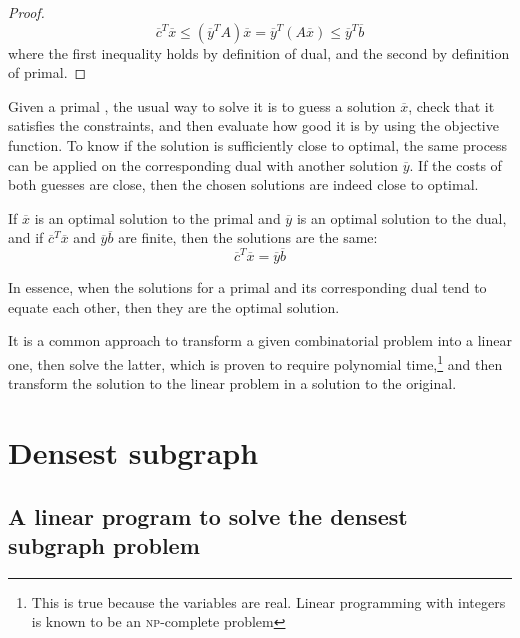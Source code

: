 \begin{proof}
    \[
        \overline{c}^T \overline{x} \leq (\overline{y}^T A)\overline{x} = \overline{y}^T (A \overline{x}) \leq \overline{y}^T \overline{b}
    \]
    where the first inequality holds by definition of dual, and the second by definition of primal.
\end{proof}

Given a primal \lp{}, the usual way to solve it is to guess a solution $\overline{x}$, check that it satisfies the constraints, and then evaluate how good it is by using the objective function. To know if the solution is sufficiently close to optimal, the same process can be applied on the corresponding dual \lp{} with another solution $\overline{y}$. If the costs of both guesses are close, then the chosen solutions are indeed close to optimal.

\begin{theorem}\label{thm:strong-duality}
    If $\overline{x}$ is an optimal solution to the primal and $\overline{y}$ is an optimal solution to the dual, and if $\overline{c}^T \overline{x}$ and $\overline{y} \overline{b}$ are finite, then the solutions are the same:
    \begin{equation}
        \overline{c}^T \overline{x} = \overline{y} \overline{b}
    \end{equation}
\end{theorem}

In essence, when the solutions for a primal and its corresponding dual tend to equate each other, then they are the optimal solution.

It is a common approach to transform a given combinatorial problem into a linear one, then solve the latter, which is proven to require polynomial time,\footnote{This is true because the variables are real. Linear programming with integers is known to be an \textsc{np}-complete problem} and then transform the solution to the linear problem in a solution to the original.


\section{Densest subgraph}\label{sec:densest-subgraph}

\subsection{A linear program to solve the densest subgraph problem} \label{sec:dsp-lp}

